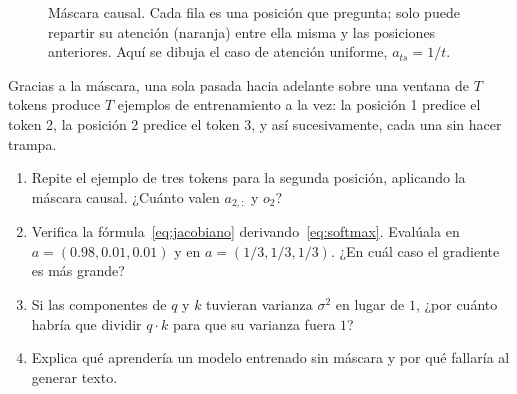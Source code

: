 \documentclass[11pt,letterpaper,oneside]{report}
\begin{document}
\begin{figure}[H]
\centering
{}
\caption{Máscara causal. Cada fila es una posición que pregunta; solo puede repartir su atención (naranja) entre ella misma y las posiciones anteriores. Aquí se dibuja el caso de atención uniforme, $a_{ts} = 1/t$.}
\label{fig:mascara}
\end{figure}

\begin{nota}
Gracias a la máscara, una sola pasada hacia adelante sobre una ventana de $T$ tokens produce $T$ ejemplos de entrenamiento a la vez: la posición 1 predice el token 2, la posición 2 predice el token 3, y así sucesivamente, cada una sin hacer trampa.
\end{nota}

\begin{ejercicio}
\begin{enumerate}[label=\alph*)]
  \item Repite el ejemplo de tres tokens para la segunda posición, aplicando la máscara causal. ¿Cuánto valen $a_{2,:}$ y $o_2$?
  \item Verifica la fórmula~\eqref{eq:jacobiano} derivando~\eqref{eq:softmax}. Evalúala en $a = (0.98, 0.01, 0.01)$ y en $a = (1/3, 1/3, 1/3)$. ¿En cuál caso el gradiente es más grande?
  \item Si las componentes de $q$ y $k$ tuvieran varianza $\sigma^2$ en lugar de $1$, ¿por cuánto habría que dividir $q\cdot k$ para que su varianza fuera $1$?
  \item Explica qué aprendería un modelo entrenado sin máscara y por qué fallaría al generar texto.
\end{enumerate}
\end{ejercicio}
\end{document}
